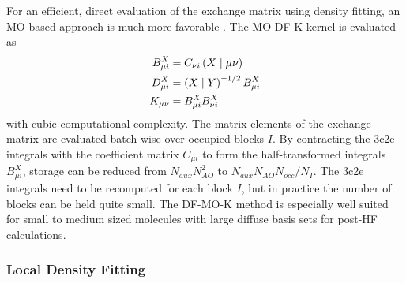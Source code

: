 For an efficient, direct evaluation of the exchange matrix using density fitting, an MO based approach is much more favorable \cite{Wei2002}. The MO-DF-K kernel is evaluated as
\begin{align}
B^{X}_{\mu i} &= C_{\nu i} \left( X \mid \mu\nu \right) \\
D^{X}_{\mu i} &= \left( X \mid Y \right)^{-1/2} B^{X}_{\mu i} \\
K_{\mu\nu} &= B^{X}_{\mu i} B^{X}_{\nu i}
\end{align}
\noindent with cubic computational complexity. The matrix elements of the exchange matrix are evaluated batch-wise over occupied blocks $I$. By contracting the 3c2e integrals with the coefficient matrix $C_{\mu i}$ to form the half-transformed integrals $B^X_{\mu i}$, storage can be reduced from $N_{aux} N_{AO}^2$ to $N_{aux} N_{AO} N_{occ} / N_I$. The 3c2e integrals need to be recomputed for each block $I$, but in practice the number of blocks can be held quite small. The DF-MO-K method is especially well suited for small to medium sized molecules with large diffuse basis sets for post-HF calculations.      


\subsubsection{Local Density Fitting}

